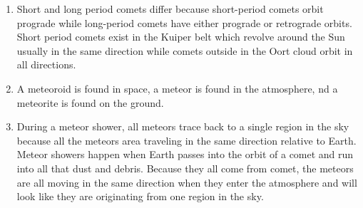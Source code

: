 \documentclass[../hw2.tex]{subfiles}
\begin{document}
    \begin{enumerate}
        \item {} Short and long period comets differ because short-period comets orbit prograde while long-period comets have either prograde or retrograde orbits. Short period comets exist in the Kuiper belt which revolve around the Sun usually in the same direction while comets outside in the Oort cloud orbit in all directions.
        \item {} A meteoroid is found in space, a meteor is found in the atmosphere, nd a meteorite is found on the ground.  
        \item {} During a meteor shower, all meteors trace back to a single region in the sky because all the meteors area traveling in the same direction relative to Earth. Meteor showers happen when Earth passes into the orbit of a comet and run into all that dust and debris. Because they all come from comet, the meteors are all moving in the same direction when they enter the atmosphere and will look like they are originating from one region in the sky.
    \end{enumerate}
    
\end{document}
